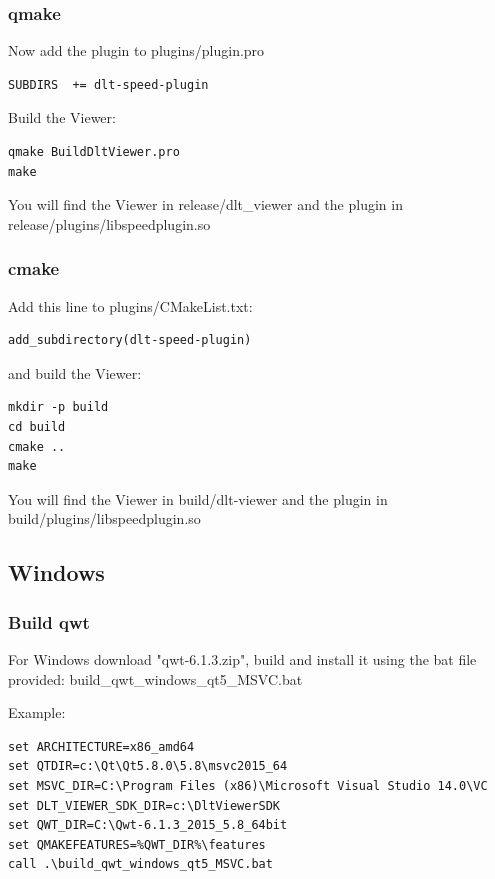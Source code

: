 \documentclass[a4paper,11pt]{article}
\begin{document}
\subsubsection{qmake}

Now add the plugin to plugins/plugin.pro

\begin{verbatim}
SUBDIRS  += dlt-speed-plugin
\end{verbatim}

Build the Viewer:
\begin{verbatim}
qmake BuildDltViewer.pro
make
\end{verbatim}

You will find the Viewer in release/dlt\_viewer and the plugin in release/plugins/libspeedplugin.so

\subsubsection{cmake}

Add this line to plugins/CMakeList.txt:

\begin{verbatim}
add_subdirectory(dlt-speed-plugin)
\end{verbatim}

and build the Viewer:

\begin{verbatim}
mkdir -p build
cd build
cmake ..
make
\end{verbatim}

You will find the Viewer in build/dlt-viewer and the plugin in build/plugins/libspeedplugin.so

\subsection{Windows}

\subsubsection{Build qwt}

For Windows download "qwt-6.1.3.zip", build and install it using the bat file provided:
build\_qwt\_windows\_qt5\_MSVC.bat

Example:
\begin{verbatim}
set ARCHITECTURE=x86_amd64
set QTDIR=c:\Qt\Qt5.8.0\5.8\msvc2015_64
set MSVC_DIR=C:\Program Files (x86)\Microsoft Visual Studio 14.0\VC
set DLT_VIEWER_SDK_DIR=c:\DltViewerSDK
set QWT_DIR=C:\Qwt-6.1.3_2015_5.8_64bit
set QMAKEFEATURES=%QWT_DIR%\features
call .\build_qwt_windows_qt5_MSVC.bat
\end{verbatim}
\end{document}
